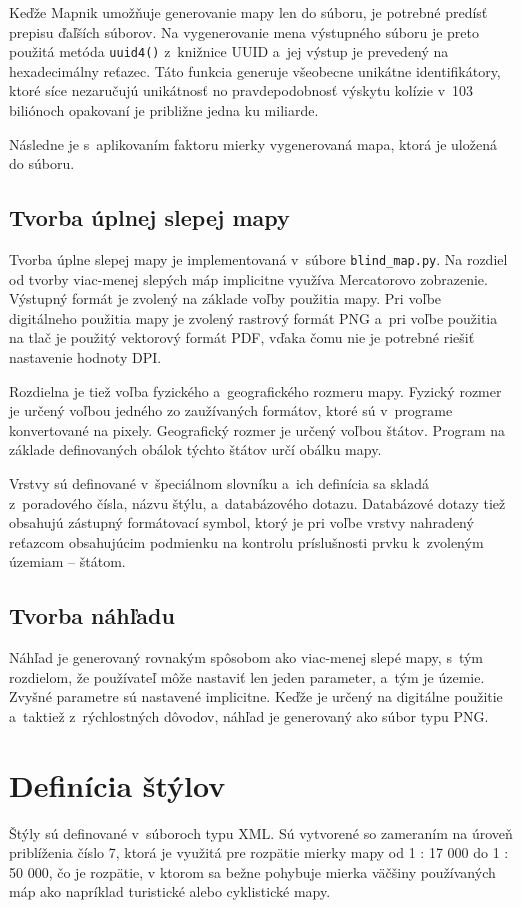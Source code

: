 Keďže Mapnik umožňuje generovanie mapy len do súboru, je potrebné predísť prepisu ďaľších súborov. Na vygenerovanie mena výstupného súboru je preto použitá metóda {\tt uuid4()} z~knižnice UUID a~jej výstup je prevedený na hexadecimálny reťazec. Táto funkcia generuje všeobecne unikátne identifikátory, ktoré síce nezaručujú unikátnosť no pravdepodobnosť výskytu kolízie v~103 biliónoch opakovaní je približne jedna ku miliarde.~\cite{uuid}

Následne je s~aplikovaním faktoru mierky vygenerovaná mapa, ktorá je uložená do súboru. 

\subsection*{Tvorba úplnej slepej mapy}
\label{implementation_blind}
Tvorba úplne slepej mapy je implementovaná v~súbore {\tt blind\_map.py}. Na rozdiel od tvorby viac-menej slepých máp implicitne využíva Mercatorovo zobrazenie. Výstupný formát je zvolený na základe voľby použitia mapy. Pri voľbe digitálneho použitia mapy je zvolený rastrový formát PNG a~pri voľbe použitia na tlač je použitý vektorový formát PDF, vďaka čomu nie je potrebné riešiť nastavenie hodnoty DPI. 

Rozdielna je tiež voľba fyzického a~geografického rozmeru mapy. Fyzický rozmer je určený voľbou jedného zo zaužívaných formátov, ktoré sú v~programe konvertované na pixely. Geografický rozmer je určený voľbou štátov. Program na základe definovaných obálok týchto štátov určí obálku mapy. 

Vrstvy sú definované v~špeciálnom slovníku a~ich definícia sa skladá z~poradového čísla, názvu štýlu, a~databázového dotazu. Databázové dotazy tiež obsahujú zástupný formátovací symbol, ktorý je pri voľbe vrstvy nahradený reťazcom obsahujúcim podmienku na kontrolu príslušnosti prvku k~zvoleným územiam -- štátom.

\subsection*{Tvorba náhľadu}
\label{implementation_preview}
Náhľad je generovaný rovnakým spôsobom ako viac-menej slepé mapy, s~tým rozdielom, že používateľ môže nastaviť len jeden parameter, a~tým je územie. Zvyšné parametre sú nastavené implicitne. Keďže je určený na digitálne použitie a~taktiež z~rýchlostných dôvodov, náhľad je generovaný ako súbor typu PNG.

\section{Definícia štýlov}
\label{styles}
Štýly sú definované v~súboroch typu XML. Sú vytvorené so zameraním na úroveň priblíženia číslo 7, ktorá je využitá pre rozpätie mierky mapy od 1 : 17 000 do 1 : 50 000, čo je rozpätie, v ktorom sa bežne pohybuje mierka väčšiny používaných máp ako napríklad turistické alebo cyklistické mapy. 

